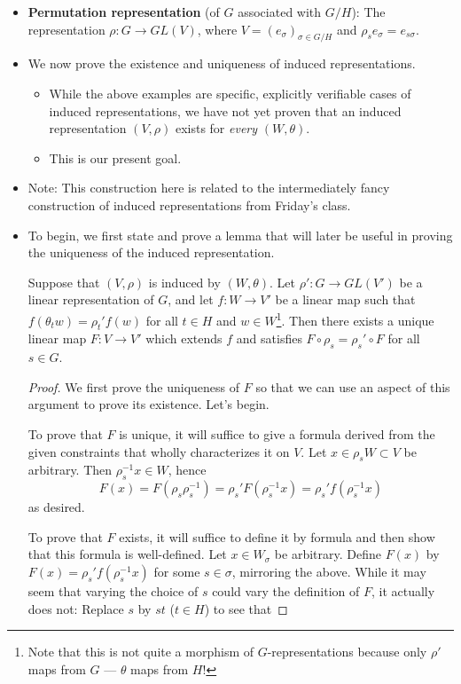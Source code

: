 \documentclass[../notes.tex]{subfiles}
\begin{document}
\begin{itemize}
\begin{enumerate}
    \end{enumerate}
    \item \textbf{Permutation representation} (of $G$ associated with $G/H$): The representation $\rho:G\to GL(V)$, where $V=(e_\sigma)_{\sigma\in G/H}$ and $\rho_se_\sigma=e_{s\sigma}$.
    \item We now prove the existence and uniqueness of induced representations.
    \begin{itemize}
        \item While the above examples are specific, explicitly verifiable cases of induced representations, we have not yet proven that an induced representation $(V,\rho)$ exists for \emph{every} $(W,\theta)$.
        \item This is our present goal.
    \end{itemize}
    \item Note: This construction here is related to the intermediately fancy construction of induced representations from Friday's class.
    \item To begin, we first state and prove a lemma that will later be useful in proving the uniqueness of the induced representation.
    \begin{lemma}\label{lem:induceUnique}
        Suppose that $(V,\rho)$ is induced by $(W,\theta)$. Let $\rho':G\to GL(V')$ be a linear representation of $G$, and let $f:W\to V'$ be a linear map such that $f(\theta_tw)=\rho_t'f(w)$ for all $t\in H$ and $w\in W$\footnote{Note that this is not quite a morphism of $G$-representations because only $\rho'$ maps from $G$ --- $\theta$ maps from $H$!}. Then there exists a unique linear map $F:V\to V'$ which extends $f$ and satisfies $F\circ\rho_s=\rho_s'\circ F$ for all $s\in G$.
        \begin{proof}
            We first prove the uniqueness of $F$ so that we can use an aspect of this argument to prove its existence. Let's begin.\par
            To prove that $F$ is unique, it will suffice to give a formula derived from the given constraints that wholly characterizes it on $V$. Let $x\in\rho_sW\subset V$ be arbitrary. Then $\rho_s^{-1}x\in W$, hence
            \begin{equation*}
                F(x) = F(\rho_s\rho_s^{-1})
                = \rho_s'F(\rho_s^{-1}x)
                = \rho_s'f(\rho_s^{-1}x)
            \end{equation*}
            as desired.\par
            To prove that $F$ exists, it will suffice to define it by formula and then show that this formula is well-defined. Let $x\in W_\sigma$ be arbitrary. Define $F(x)$ by $F(x)=\rho_s'f(\rho_s^{-1}x)$ for some $s\in\sigma$, mirroring the above. While it may seem that varying the choice of $s$ could vary the definition of $F$, it actually does not: Replace $s$ by $st$ ($t\in H$) to see that

\end{proof}
\end{lemma}
\end{itemize}
\end{document}
